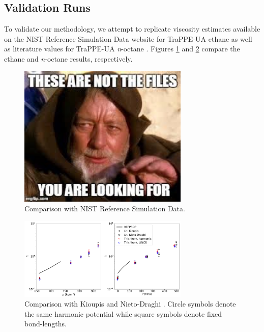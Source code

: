 \documentclass[preprint,review,12pt]{elsarticle}
\begin{document}
	
	\subsection{Validation Runs}
	
    To validate our methodology, we attempt to replicate viscosity estimates available on the NIST Reference Simulation Data website for TraPPE-UA ethane as well as literature values for TraPPE-UA \textit{n}-octane \cite{Nieto2006}. Figures \ref{fig:validation_runs} and \ref{fig:validation_runs2} compare the ethane and \textit{n}-octane results, respectively.
    
    
    \begin{figure}[htb!]
    	\centering
    	\includegraphics[width=3.2in]{empty_figure.jpg}
    	\caption{Comparison with NIST Reference Simulation Data.}
    	\label{fig:validation_runs}
    \end{figure} 

    \begin{figure}[htb!]
		\centering
		\includegraphics[width=3.2in]{validation_TraPPE_octane.png}
		\caption{Comparison with Kioupis \cite{Kioupis2000} and Nieto-Draghi \cite{Nieto2006}. Circle symbols denote the same harmonic potential while square symbols denote fixed bond-lengths.}
		\label{fig:validation_runs2}
	\end{figure}
    
\end{document}
